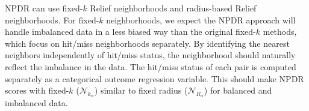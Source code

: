 \documentclass[10pt]{article}
\begin{document}
NPDR can use fixed-$k$ Relief neighborhoods and radius-based Relief neighborhoods. For fixed-$k$ neighborhoods, we expect the NPDR approach will handle imbalanced data in a less biased way than the original fixed-$k$ methods, which focus on hit/miss neighborhoods separately. By identifying the nearest neighbors independently of hit/miss status, the neighborhood should naturally reflect the imbalance in the data. The hit/miss status of each pair is computed separately as a categorical outcome regression variable. This should make NPDR scores with fixed-$k$ ($\mathcal{N}_{k_\alpha}$) similar to fixed radius ($\mathcal{N}_{R_\alpha}$) for balanced and imbalanced data.    


\end{document}
